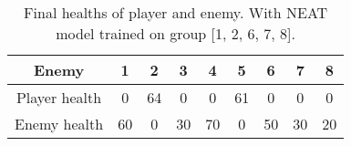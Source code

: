 \begin{table}[ht]\centering
\begin{tabular}{|c|c|c|c|c|c|c|c|c|}
\hline
Enemy & 1 & 2 & 3 & 4 & 5 & 6 & 7 & 8\\
\hline
Player health & 0 & 64 & 0 & 0 & 61 & 0 & 0 & 0\\
\hline
Enemy health & 60 & 0 & 30 & 70 & 0 & 50 & 30 & 20\\
\hline
\end{tabular}
\caption{Final healths of player and enemy. With NEAT model trained on group [1, 2, 6, 7, 8].}
\label{tab:test_NEAT_1_2_6_7_8}
\end{table}